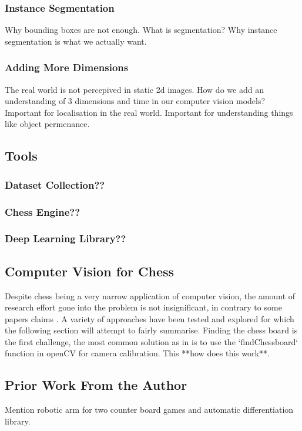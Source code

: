\subsubsection{Instance Segmentation}
Why bounding boxes are not enough.  What is segmentation? Why instance segmentation is what we actually want. \cite{}
\subsubsection{Adding More Dimensions}
The real world is not percepived in static 2d images.  How do we add an understanding of 3 dimensions and time in our computer vision models? \cite{}
Important for localisation in the real world.  Important for understanding things like object permenance.

\subsection{Tools}
\subsubsection{Dataset Collection??}
\subsubsection{Chess Engine??}
\subsubsection{Deep Learning Library??}

\subsection{Computer Vision for Chess}
Despite chess being a very narrow application of computer vision, the amount of research effort gone into the problem is not insignificant, 
in contrary to some papers claims \cite{}.  A variety of approaches have been tested and explored for which the following section will attempt to fairly summarise.
Finding the chess board is the first challenge, the most common solution as in \cite{} 
is to use the `findChessboard` function in openCV for camera calibration.  This **how does 
this work**.  

\subsection{Prior Work From the Author}
Mention robotic arm for two counter board games and automatic differentiation library.

